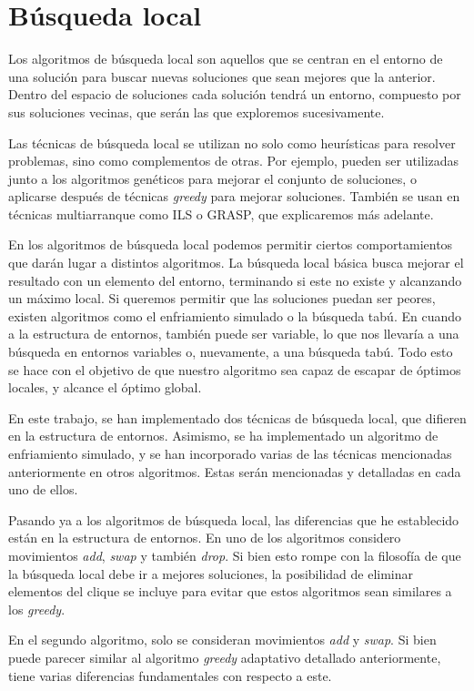 \section{Búsqueda local}

Los algoritmos de búsqueda local son aquellos que se centran en el entorno de una solución
para buscar nuevas soluciones que sean mejores que la anterior. Dentro del espacio de soluciones
cada solución tendrá un entorno, compuesto por sus soluciones vecinas, que serán las que exploremos
sucesivamente.

Las técnicas de búsqueda local se utilizan no solo como heurísticas para resolver problemas,
sino como complementos de otras. Por ejemplo, pueden ser utilizadas junto a los algoritmos genéticos
para mejorar el conjunto de soluciones, o aplicarse después de técnicas \textit{greedy} para mejorar
soluciones. También se usan en técnicas multiarranque como ILS o GRASP, que explicaremos más adelante.

En los algoritmos de búsqueda local podemos permitir ciertos comportamientos que darán lugar a
distintos algoritmos. La búsqueda local básica busca mejorar el resultado con un elemento del
entorno, terminando si este no existe y alcanzando un máximo local. Si queremos permitir que
las soluciones puedan ser peores, existen algoritmos como el enfriamiento simulado o la búsqueda
tabú. En cuando a la estructura de entornos, también puede ser variable, lo que nos llevaría
a una búsqueda en entornos variables o, nuevamente, a una búsqueda tabú. Todo esto se hace con
el objetivo de que nuestro algoritmo sea capaz de escapar de óptimos locales, y alcance el
óptimo global.

En este trabajo, se han implementado dos técnicas de búsqueda local, que difieren en la estructura de
entornos. Asimismo, se ha implementado un algoritmo de enfriamiento simulado, y se han incorporado
varias de las técnicas mencionadas anteriormente en otros algoritmos. Estas serán mencionadas y
detalladas en cada uno de ellos.

Pasando ya a los algoritmos de búsqueda local, las diferencias que he establecido están en la estructura
de entornos. En uno de los algoritmos considero movimientos \textit{add}, \textit{swap} y también \textit{drop}.
Si bien esto rompe con la filosofía de que la búsqueda local debe ir a mejores soluciones, la posibilidad de
eliminar elementos del clique se incluye para evitar que estos algoritmos sean similares a los
\textit{greedy}.

En el segundo algoritmo, solo se consideran movimientos \textit{add} y \textit{swap}. Si bien puede
parecer similar al algoritmo \textit{greedy} adaptativo detallado anteriormente, tiene varias diferencias
fundamentales con respecto a este.

